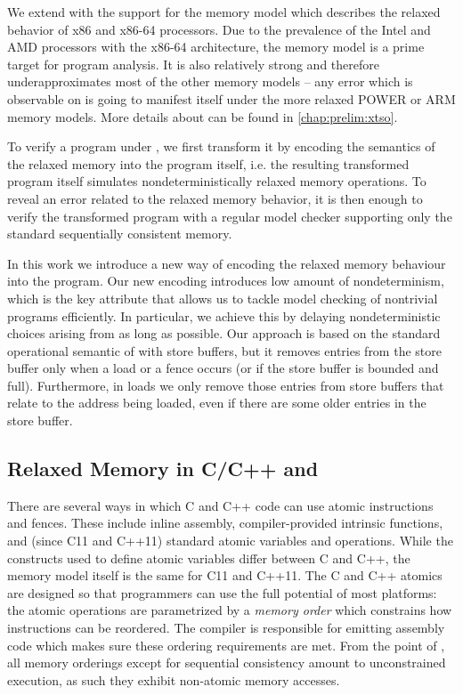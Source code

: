 We extend \divine with the support for the \xtso memory model 
which describes the relaxed behavior of x86 and x86-64 processors.
Due to the prevalence of the Intel and AMD processors with the x86-64
architecture, the \xtso memory model is a prime target for program analysis.
It is also relatively strong and therefore underapproximates most of the other
memory models -- any error which is observable on \xtso is going to manifest
itself under the more relaxed POWER or ARM memory models.
More details about \xtso can be found in \autoref{chap:prelim:xtso}.

To verify a program under \xtso, we first transform it by encoding the
semantics of the relaxed memory into the program itself, i.e. the resulting
transformed program itself simulates nondeterministically relaxed memory
operations.
To reveal an error related to the relaxed memory behavior, it is then enough to
verify the transformed program with a regular model checker supporting only the
standard sequentially consistent memory.

In this work we introduce a new way of encoding the relaxed memory behaviour
into the program.
Our new encoding introduces low amount of nondeterminism, which is the key
attribute that allows us to tackle model checking of nontrivial programs
efficiently.
In particular, we achieve this by delaying nondeterministic choices arising
from \xtso as long as possible.
Our approach is based on the standard operational semantic of \xtso with store
buffers, but it removes entries from the store buffer only when a load or a
fence occurs (or if the store buffer is bounded and full).
Furthermore, in loads we only remove those entries from store buffers that
relate to the address being loaded, even if there are some older entries in the
store buffer.


\subsection{Relaxed Memory in C/C++ and \llvm}

There are several ways in which C and C++ code can use atomic instructions and fences.
These include inline assembly, compiler-provided intrinsic functions, and (since C11 and C++11) standard atomic variables and operations.
While the constructs used to define atomic variables differ between C and C++, the memory model itself is the same for C11 and C++11.
The C and C++ atomics are designed so that programmers can use the full potential of most platforms: the atomic operations are parametrized by a \emph{memory order} which constrains how instructions can be reordered.
The compiler is responsible for emitting assembly code which makes sure these ordering requirements are met.
From the point of \xtso, all memory orderings except for sequential consistency
amount to unconstrained execution, as such they exhibit non-atomic memory accesses.

